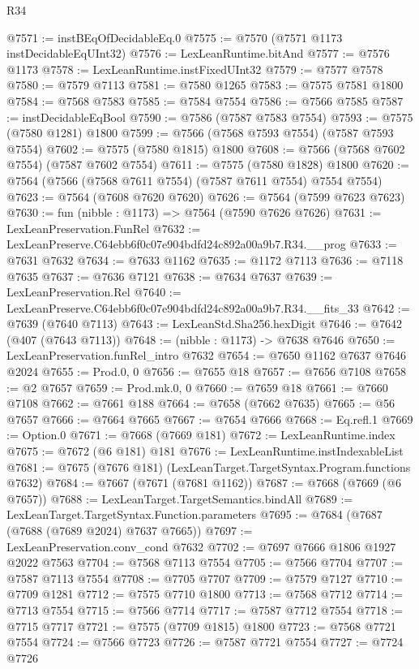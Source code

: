 \begin{lexlean}{R34}
\begin{coremodule}
@7571 := instBEqOfDecidableEq.{0}
@7575 := @7570 (@7571 @1173 instDecidableEqUInt32)
@7576 := LexLeanRuntime.bitAnd
@7577 := @7576 @1173
@7578 := LexLeanRuntime.instFixedUInt32
@7579 := @7577 @7578
@7580 := @7579 @7113
@7581 := @7580 @1265
@7583 := @7575 @7581 @1800
@7584 := @7568 @7583
@7585 := @7584 @7554
@7586 := @7566 @7585
@7587 := instDecidableEqBool
@7590 := @7586 (@7587 @7583 @7554)
@7593 := @7575 (@7580 @1281) @1800
@7599 := @7566 (@7568 @7593 @7554) (@7587 @7593 @7554)
@7602 := @7575 (@7580 @1815) @1800
@7608 := @7566 (@7568 @7602 @7554) (@7587 @7602 @7554)
@7611 := @7575 (@7580 @1828) @1800
@7620 := @7564 (@7566 (@7568 @7611 @7554) (@7587 @7611 @7554) @7554 @7554)
@7623 := @7564 (@7608 @7620 @7620)
@7626 := @7564 (@7599 @7623 @7623)
@7630 := fun (nibble : @1173) => @7564 (@7590 @7626 @7626)
@7631 := LexLeanPreservation.FunRel
@7632 := LexLeanPreserve.C64ebb6f0c07e904bdfd24c892a00a9b7.R34.__prog
@7633 := @7631 @7632
@7634 := @7633 @1162
@7635 := @1172 @7113
@7636 := @7118 @7635
@7637 := @7636 @7121
@7638 := @7634 @7637
@7639 := LexLeanPreservation.Rel
@7640 := LexLeanPreserve.C64ebb6f0c07e904bdfd24c892a00a9b7.R34.__fits_33
@7642 := @7639 (@7640 @7113)
@7643 := LexLeanStd.Sha256.hexDigit
@7646 := @7642 (@407 (@7643 @7113))
@7648 := (nibble : @1173) -> @7638 @7646
@7650 := LexLeanPreservation.funRel_intro @7632
@7654 := @7650 @1162 @7637 @7646 @2024
@7655 := Prod.{0, 0}
@7656 := @7655 @18
@7657 := @7656 @7108
@7658 := @2 @7657
@7659 := Prod.mk.{0, 0}
@7660 := @7659 @18
@7661 := @7660 @7108
@7662 := @7661 @188
@7664 := @7658 (@7662 @7635)
@7665 := @56 @7657
@7666 := @7664 @7665
@7667 := @7654 @7666
@7668 := Eq.refl.{1}
@7669 := Option.{0}
@7671 := @7668 (@7669 @181)
@7672 := LexLeanRuntime.index
@7675 := @7672 (@6 @181) @181
@7676 := LexLeanRuntime.instIndexableList
@7681 := @7675 (@7676 @181) (LexLeanTarget.TargetSyntax.Program.functions @7632)
@7684 := @7667 (@7671 (@7681 @1162))
@7687 := @7668 (@7669 (@6 @7657))
@7688 := LexLeanTarget.TargetSemantics.bindAll
@7689 := LexLeanTarget.TargetSyntax.Function.parameters
@7695 := @7684 (@7687 (@7688 (@7689 @2024) @7637 @7665))
@7697 := LexLeanPreservation.conv_cond @7632
@7702 := @7697 @7666 @1806 @1927 @2022 @7563
@7704 := @7568 @7113 @7554
@7705 := @7566 @7704
@7707 := @7587 @7113 @7554
@7708 := @7705 @7707
@7709 := @7579 @7127
@7710 := @7709 @1281
@7712 := @7575 @7710 @1800
@7713 := @7568 @7712
@7714 := @7713 @7554
@7715 := @7566 @7714
@7717 := @7587 @7712 @7554
@7718 := @7715 @7717
@7721 := @7575 (@7709 @1815) @1800
@7723 := @7568 @7721 @7554
@7724 := @7566 @7723
@7726 := @7587 @7721 @7554
@7727 := @7724 @7726

\end{coremodule}
\end{lexlean}
